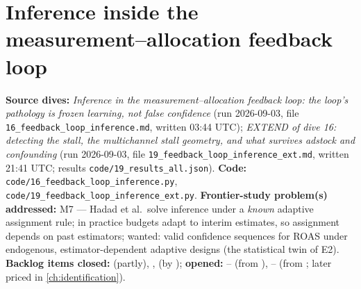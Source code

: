 \chapter[Inference inside the feedback loop]{Inference inside the\\ measurement--allocation feedback loop}
\label{ch:feedback}

\begin{provenance}
\textbf{Source dives:}  \emph{Inference in the measurement--allocation feedback loop: the loop's pathology is frozen learning, not false confidence} (run 2026-09-03, file \texttt{16\_feedback\_loop\_inference.md}, written 03:44 UTC);  \emph{EXTEND of dive 16: detecting the stall, the multichannel stall geometry, and what survives adstock and confounding} (run 2026-09-03, file \texttt{19\_feedback\_loop\_inference\_ext.md}, written 21:41 UTC; results \texttt{code/19\_results\_all.json}).
\textbf{Code:} \texttt{code/16\_feedback\_loop\_inference.py}, \texttt{code/19\_feedback\_loop\_inference\_ext.py}.
\textbf{Frontier-study problem(s) addressed:} M7 --- Hadad et al.\ solve inference under a \emph{known} adaptive assignment rule; in practice budgets adapt to interim estimates, so assignment depends on past estimators; wanted: valid confidence sequences for ROAS under endogenous, estimator-dependent adaptive designs (the statistical twin of E2).
\textbf{Backlog items closed:}  (partly), ,  (by ); \textbf{opened:} -- (from ), -- (from ;  later priced in \cref{ch:identification}).
\end{provenance}

